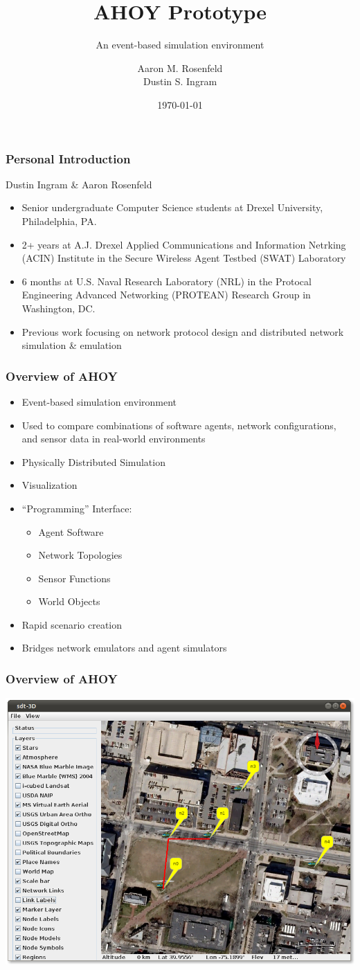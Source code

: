\documentclass[mathserif]{beamer}
\title{AHOY Prototype}
\subtitle{An event-based simulation environment}
\author{Aaron M. Rosenfeld \\ Dustin S. Ingram}
\date{\today}
\begin{document}
\frame{\titlepage}

\frame
{
    \frametitle{Personal Introduction}
    Dustin Ingram \& Aaron Rosenfeld
    \begin{itemize}
	\item Senior undergraduate Computer Science students at Drexel University, Philadelphia, PA.
	\item 2+ years at A.J. Drexel Applied Communications and Information Netrking (ACIN) Institute in the Secure Wireless Agent Testbed (SWAT) Laboratory
	\item 6 months at U.S. Naval Research Laboratory (NRL) in the Protocal Engineering Advanced Networking (PROTEAN) Research Group in Washington, DC.
	\item Previous work focusing on network protocol design and distributed network simulation \& emulation
    \end{itemize}
}

\frame
{
    \frametitle{Overview of AHOY}
    \begin{itemize}
	\item Event-based simulation environment
	\item Used to compare combinations of software agents, network configurations, and sensor data in real-world environments
	\item Physically Distributed Simulation
	\item Visualization
	\item ``Programming'' Interface:
	\begin{itemize}
	    \item Agent Software
	    \item Network Topologies
	    \item Sensor Functions
	    \item World Objects
	\end{itemize}
	\item Rapid scenario creation
	\item Bridges network emulators and agent simulators
    \end{itemize}
}

\frame
{
    \frametitle{Overview of AHOY}
    \begin{center}
        \includegraphics[scale=.3]{ss2.png}
    \end{center}
}
\end{document}
